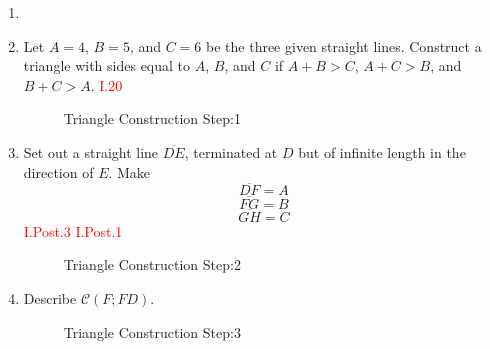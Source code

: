 \begin{con}

\begin{enumerate}

\item[]

\item Let $A = 4$, $B = 5$, and $C = 6$ be the three given straight lines. Construct a triangle with sides equal to $A$, $B$, and $C$ if $A + B > C$, $A + C > B$, and $B + C > A$. \hfill\textcolor{red}{I.20}

\begin{figure}[H]
	\caption{Triangle Construction Step:1}
\end{figure}

\item Set out a straight line $\overline{DE}$, terminated at $D$ but of infinite length in the direction of $E$. Make 
\[\overline{DF} = A\]
\[\overline{FG} = B\]  
\[\overline{GH} = C\] \hfill\textcolor{red}{I.Post.3 I.Post.1}

\vspace{2cm}

\begin{figure}[H]
	\caption{Triangle Construction Step:2}
\end{figure}

\clearpage

\item Describe $\mathscr{C}(F;FD)$. 

\begin{figure}[H]
	\caption{Triangle Construction Step:3}
\end{figure}


\end{enumerate}
\end{con}
